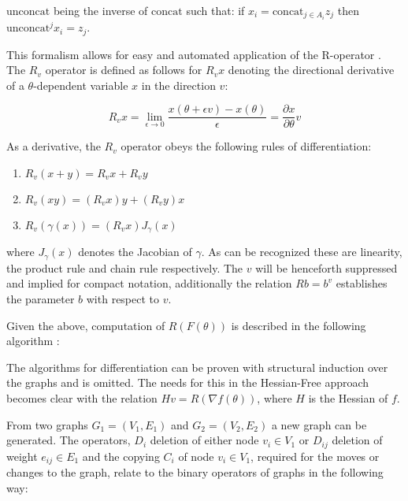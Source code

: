 $\text{unconcat}$ being the inverse of $\text{concat}$ such that: if $x_i = \text{concat}_{j\in A_i} z_j$ then $\text{unconcat}^j x_i = z_j$. 

This formalism allows for easy and automated application of the R-operator \cite{pepe}. The $R_v$ operator is defined as follows for $R_vx $ denoting the directional derivative of a $\theta$-dependent variable $x$ in the direction $v$:

\[R_vx = \lim_{\epsilon\to 0} \frac{x(\theta + \epsilon v) - x(\theta)}{\epsilon} = \frac{\partial x}{\partial\theta}v\]

As a derivative, the $R_v$ operator obeys the following rules of differentiation:

\begin{enumerate}
    \item $R_v(x+y) = R_vx + R_vy$
    \item $ R_v(xy) = (R_vx)y + (R_vy)x $
    \item $R_v(\gamma(x)) = (R_vx) J_{\gamma}(x)$
\end{enumerate}

where $J_\gamma(x)$ denotes the Jacobian of $\gamma$. As can be recognized these are linearity, the product rule and chain rule respectively. The $v$ will be henceforth suppressed and implied for compact notation, additionally the relation $Rb = b^v$ establishes the parameter $b$ with respect to $v$.

Given the above, computation of $R(F(\theta))$ is described in the following algorithm \cite{suts}:

\begin{algorithmic}[1]
    \EndFor
\end{algorithmic}

The algorithms for differentiation can be proven with structural induction over the graphs and is omitted. The needs for this in the Hessian-Free approach becomes clear with the relation $Hv = R(\nabla f(\theta))$, where $H$ is the Hessian of $f$. 

From two graphs $G_1 = (V_1,E_1)$ and $G_2 = (V_2, E_2)$ a new graph can be generated. The operators, $D_i$ deletion of either node $v_i \in V_1$ or $D_{ij}$ deletion of weight $e_{ij} \in E_1$ and the copying $C_i$ of node $v_i \in V_1$, required for the moves or changes to the graph, relate to the binary operators of graphs in the following way:

